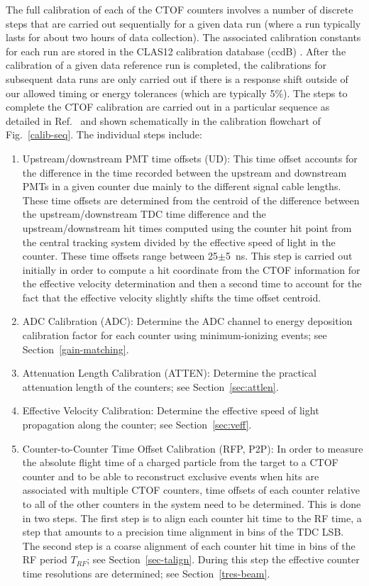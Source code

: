 \documentclass[3p,times,twocolumn]{elsarticle}
\begin{document}
The full calibration of each of the CTOF counters involves a number of discrete steps that are carried out
sequentially for a given data run (where a run typically lasts for about two hours of data collection). The
associated calibration constants for each run are stored in the CLAS12 calibration database (ccdB)
\cite{recon-nim}. After the calibration of a given data reference run is completed, the calibrations for
subsequent data runs are only carried out if there is a response shift outside of our allowed timing or energy
tolerances (which are typically 5\%). The steps to complete the CTOF calibration are carried out in a
particular sequence as detailed in Ref.~\cite{ctof-calib} and shown schematically in the calibration flowchart of
Fig.~\ref{calib-seq}. The individual steps include:

\begin{enumerate}
\item Upstream/downstream PMT time offsets (UD): This time offset accounts for the difference in the
time recorded between the upstream and downstream PMTs in a given counter due mainly to the different
signal cable lengths. These time offsets are determined from the centroid of the difference between the
upstream/downstream TDC time difference and the upstream/downstream hit times computed using the
counter hit point from the central tracking system divided by the effective speed of light in the counter.
These time offsets range between 25$\pm$5~ns. This step is carried out initially in order to compute a hit
coordinate from the CTOF information for the effective velocity determination and then a second time to
account for the fact that the effective velocity slightly shifts the time offset centroid.

\item ADC Calibration (ADC): Determine the ADC channel to energy deposition calibration factor for each
counter using minimum-ionizing events; see Section~\ref{gain-matching}.

\item Attenuation Length Calibration (ATTEN): Determine the practical attenuation length of the counters;
see Section~\ref{sec:attlen}.

\item Effective Velocity Calibration: Determine the effective speed of light propagation along the
counter; see Section~\ref{sec:veff}.

\item Counter-to-Counter Time Offset Calibration (RFP, P2P): In order to measure the absolute flight time
of a charged particle from the target to a CTOF counter and to be able to reconstruct exclusive events
when hits are associated with multiple CTOF counters, time offsets of each counter relative to all of the
other counters in the system need to be determined. This is done in two steps. The first step is to align each
counter hit time to the RF time, a step that amounts to a precision time alignment in bins of the TDC LSB. The
second step is a coarse alignment of each counter hit time in bins of the RF period $T_{RF}$; see
Section~\ref{sec-talign}. During this step the effective counter time resolutions are determined; see
Section~\ref{tres-beam}.


\end{enumerate}
\end{document}
